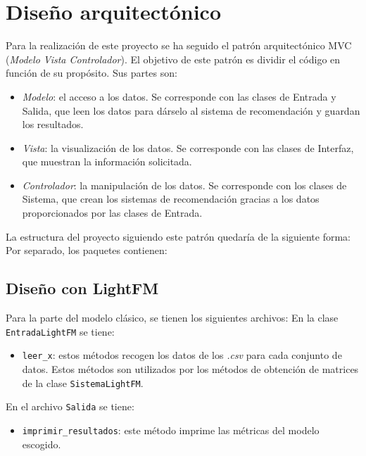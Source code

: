 \section{Diseño arquitectónico}
Para la realización de este proyecto se ha seguido el patrón arquitectónico MVC (\textit{Modelo Vista Controlador}). El objetivo de este patrón es dividir el código en función de su propósito. Sus partes son:
\begin{itemize}
\tightlist
\item \textit{Modelo}: el acceso a los datos. Se corresponde con las clases de Entrada y Salida, que leen los datos para dárselo al sistema de recomendación y guardan los resultados.
\item \textit{Vista}: la visualización de los datos. Se corresponde con las clases de Interfaz, que muestran la información solicitada.
\item \textit{Controlador}: la manipulación de los datos. Se corresponde con los clases de Sistema, que crean los sistemas de recomendación gracias a los datos proporcionados por las clases de Entrada.
\end{itemize}


La estructura del proyecto siguiendo este patrón quedaría de la siguiente forma:
Por separado, los paquetes contienen:

\subsection{Diseño con LightFM}\label{diseño-lightfm}
Para la parte del modelo clásico, se tienen los siguientes archivos:
En la clase \texttt{EntradaLightFM} se tiene:
\begin{itemize}
\tightlist
\item \texttt{leer\_x}: estos métodos recogen los datos de los \textit{.csv} para cada conjunto de datos. Estos métodos son utilizados por los métodos de obtención de matrices de la clase \texttt{SistemaLightFM}.
\end{itemize}

En el archivo \texttt{Salida} se tiene:
\begin{itemize}
\tightlist
\item \texttt{imprimir\_resultados}: este método imprime las métricas del modelo escogido.
\end{itemize}

